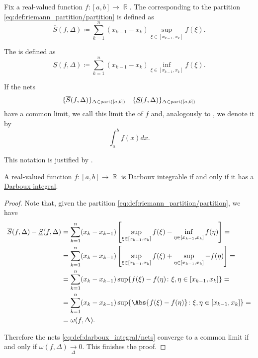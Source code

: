 \begin{definition}\label{def:darboux_integral}
  Fix a real-valued function \( f: [a, b] \to \BbbR \). The  corresponding to the partition \eqref{eq:def:riemann_partition/partition} is defined as
  \begin{equation*}
    \overline{S}(f, \Delta) \coloneqq \sum_{k=1}^n (x_{k-1} - x_k) \sup_{\xi \in [x_{k-1}, x_k]} f(\xi).
  \end{equation*}

  The  is defined as
  \begin{equation*}
    \underline{S}(f, \Delta) \coloneqq \sum_{k=1}^n (x_{k-1} - x_k) \inf_{\xi \in [x_{k-1}, x_k]} f(\xi).
  \end{equation*}

  If the nets
  \begin{align}\label{eq:def:darboux_integral/nets}
    \{ \overline{S}(f, \Delta) \}_{\Delta \in \operatorname{part}([a, b])}
    &&
    \{ \underline{S}(f, \Delta) \}_{\Delta \in \operatorname{part}([a, b])}
  \end{align}
  have a common limit, we call this limit the  of \( f \) and, analogously to , we denote it by
  \begin{equation*}
    \int_a^b f(x) dx.
  \end{equation*}

  This notation is justified by .
\end{definition}

\begin{proposition}\label{thm:darboux_integrable_iff_has_darboux_integral}
  A real-valued function \( f: [a, b] \to \BbbR \) is \hyperref[def:darboux_integrability]{Darboux integrable} if and only if it has a \hyperref[def:darboux_integral]{Darboux integral}.
\end{proposition}
\begin{proof}
  Note that, given the partition \eqref{eq:def:riemann_partition/partition}, we have
  \begin{align*}
    \overline{S}(f, \Delta) - \underline{S}(f, \Delta)
    &=
    \sum_{k=1}^n (x_k - x_{k-1}) \left[ \sup_{\xi \in [x_{k-1}, x_k]} f(\xi) - \inf_{\eta \in [x_{k-1}, x_k]} f(\eta) \right]
    = \\ &=
    \sum_{k=1}^n (x_k - x_{k-1}) \left[ \sup_{\xi \in [x_{k-1}, x_k]} f(\xi) + \sup_{\eta \in [x_{k-1}, x_k]} -f(\eta) \right]
    = \\ &=
    \sum_{k=1}^n (x_k - x_{k-1}) \sup \{ f(\xi) - f(\eta) \colon \xi, \eta \in [x_{k-1}, x_k] \}
    = \\ &=
    \sum_{k=1}^n (x_k - x_{k-1}) \sup \{ \Abs{f(\xi) - f(\eta)} \colon \xi, \eta \in [x_{k-1}, x_k] \}
    = \\ &=
    \omega(f, \Delta).
  \end{align*}

  Therefore the nets \eqref{eq:def:darboux_integral/nets} converge to a common limit if and only if \( \omega(f, \Delta) \xrightarrow[\Delta]{} 0 \). This finishes the proof.
\end{proof}

